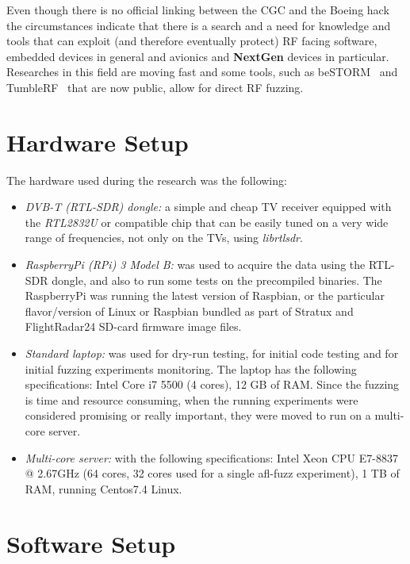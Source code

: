 \documentclass[../main.tex]{subfiles}
\begin{document}
Even though there is no official linking between the CGC and the Boeing hack the
circumstances indicate that there is a search and a need for knowledge and tools
that can exploit (and therefore eventually protect) RF facing software, embedded
devices in general and avionics and \textbf{NextGen} devices in particular. Researches in
this field are moving fast and some tools, such as beSTORM~\cite{bestorm} and
TumbleRF~\cite{tumblerf} that are now public, allow for direct RF fuzzing.

\section{Hardware Setup}

The hardware used during the research was the following:
\begin{itemize}

\item \textit{DVB-T (RTL-SDR) dongle:} a simple and cheap TV receiver equipped with the \emph{RTL2832U} or compatible chip that can be easily tuned on a very wide range of frequencies, not only on the TVs, using \emph{librtlsdr}.

\item \textit{RaspberryPi (RPi) 3 Model B:} was used to acquire the data using the RTL-SDR dongle, and also to run some tests on the precompiled binaries. The RaspberryPi was running the latest version of Raspbian, or the particular flavor/version of Linux or Raspbian bundled as part of Stratux and FlightRadar24 SD-card firmware image files.

\item \textit{Standard laptop:} was used for dry-run testing, for initial code testing and for initial fuzzing experiments monitoring. The laptop has the following specifications: Intel Core i7 5500 (4 cores), 12 GB of RAM. Since the fuzzing is time and resource consuming, when the running experiments were considered promising or really important, they were moved to run on a multi-core server.

\item \textit{Multi-core server:} with the following specifications: Intel Xeon CPU E7-8837 @ 2.67GHz (64 cores, 32 cores used for a single afl-fuzz experiment), 1 TB of RAM, running Centos7.4 Linux.
\end{itemize}

\section{Software Setup}
\end{document}
